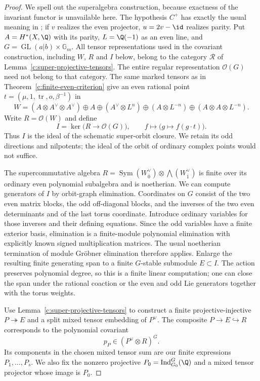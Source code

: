 \begin{proof}
We spell out the superalgebra construction, because exactness of
the invariant functor is unavailable here.  The hypothesis $C^+$
has exactly the usual meaning in
\citet[section~1, p.~1389]{c_tabuada2018sign}; if $v$ realizes the
even projector, $u=2v-\id$ realizes parity.
Put $A=H^*(X,\Q)$ with its parity, $L=\Q(-1)$ as an even line,
and $G=\operatorname{GL}(a|b)\times\mathbb G_m$.
All tensor representations used in the covariant construction,
including $W$, $R$ and $I$ below, belong to the category $\mathcal R$
of Lemma~\ref{c:super-projective-tensors}.  The entire regular
representation $\mathcal O(G)$ need not belong to that category.
The same marked tensors as in
Theorem~\ref{c:finite-even-criterion} give an even rational point
$t=(\mu,1,\operatorname{tr},o,\beta^{-1})$ in
\[
 W=(A\otimes A^\vee\otimes A^\vee)\oplus A
   \oplus(A^\vee\otimes L^n)
   \oplus(A\otimes L^{-n})
   \oplus(A\otimes A\otimes L^{-n}).
\]
Write $R=\mathcal O(W)$ and define
\[
 I=\ker\bigl(R\longrightarrow\mathcal O(G)\bigr),
 \qquad f\longmapsto\bigl(g\longmapsto f(g\cdot t)\bigr).
\]
Thus $I$ is the ideal of the schematic super-orbit closure.  We
retain its odd directions and nilpotents; the ideal of the orbit
of ordinary complex points would not suffice.

The supercommutative algebra
$R=\operatorname{Sym}(W_{\bar0}^\vee)\otimes
\bigwedge(W_{\bar1}^\vee)$ is finite over its ordinary even
polynomial subalgebra and is noetherian.  We can compute generators
of $I$ by orbit-graph elimination.  Coordinates on $G$ consist of
the two even matrix blocks, the odd off-diagonal blocks, and the
inverses of the two even determinants and of the last torus
coordinate.  Introduce ordinary variables for those inverses and
their defining equations.  Since the odd variables have a finite
exterior basis, elimination is a finite-module polynomial
elimination with explicitly known signed multiplication matrices.
The usual noetherian termination of module Gr\"obner elimination
therefore applies.  Enlarge the resulting finite generating span
to a finite $G$-stable submodule $E\subset I$.  The action preserves
polynomial degree, so this is a finite linear computation; one can
close the span under the rational coaction or the even and odd Lie
generators together with the torus weights.

Use Lemma~\ref{c:super-projective-tensors} to construct a finite
projective-injective $P\twoheadrightarrow E$ and a split mixed
tensor embedding of $P^\vee$.  The composite $P\to E\hookrightarrow R$
corresponds to the polynomial covariant
\[
 p_P\in(P^\vee\otimes R)^G.
\]
Its components in the chosen mixed tensor sum are our finite
expressions $P_1,\ldots,P_s$.  We also fix the nonzero projective
$P_0=\operatorname{Ind}_{G_0}^{G}(\Q)$ and a mixed tensor projector
whose image is $P_0$.


\end{proof}
